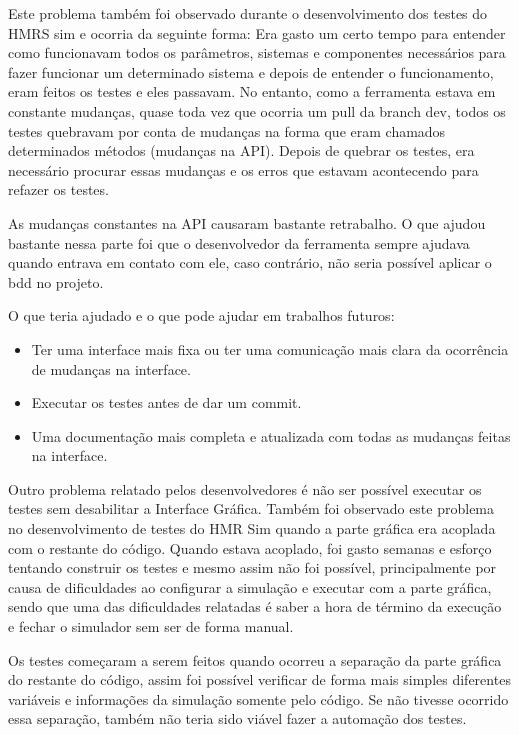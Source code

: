 Este problema também foi observado durante o desenvolvimento dos testes do HMRS sim e ocorria da seguinte forma: Era gasto um certo tempo para entender como funcionavam todos os parâmetros, sistemas e componentes necessários para fazer funcionar um determinado sistema e depois de entender o funcionamento, eram feitos os testes e eles passavam. No entanto, como a ferramenta estava em constante mudanças, quase toda vez que ocorria um pull da branch dev, todos os testes quebravam por conta de mudanças na forma que eram chamados determinados métodos (mudanças na API). Depois de quebrar os testes, era necessário procurar essas mudanças e os erros que estavam acontecendo para refazer os testes. 

As mudanças constantes na API causaram bastante retrabalho. O que ajudou bastante nessa parte foi que o desenvolvedor da ferramenta sempre ajudava quando entrava em contato com ele, caso contrário, não seria possível aplicar o bdd no projeto.

O que teria ajudado e o que pode ajudar em trabalhos futuros: 
\begin{itemize}
    \item Ter uma interface mais fixa ou ter uma comunicação mais clara da ocorrência de mudanças na interface.
    \item Executar os testes antes de dar um commit.
    \item Uma documentação mais completa e atualizada com todas as mudanças feitas na interface.
\end{itemize}

Outro problema relatado pelos desenvolvedores é não ser possível executar os testes sem desabilitar a Interface Gráfica. Também foi observado este problema no desenvolvimento de testes do HMR Sim quando a parte gráfica era acoplada com o restante do código. Quando estava acoplado, foi gasto semanas e esforço tentando construir os testes e mesmo assim não foi possível, principalmente por causa de dificuldades ao configurar a simulação e executar com a parte gráfica, sendo que uma das dificuldades relatadas é saber a hora de término da execução e fechar o simulador sem ser de forma manual.

Os testes começaram a serem feitos quando ocorreu a separação da parte gráfica do restante do código, assim foi possível verificar de forma mais simples diferentes variáveis e informações da simulação somente pelo código. Se não tivesse ocorrido essa separação, também não teria sido viável fazer a automação dos testes.

